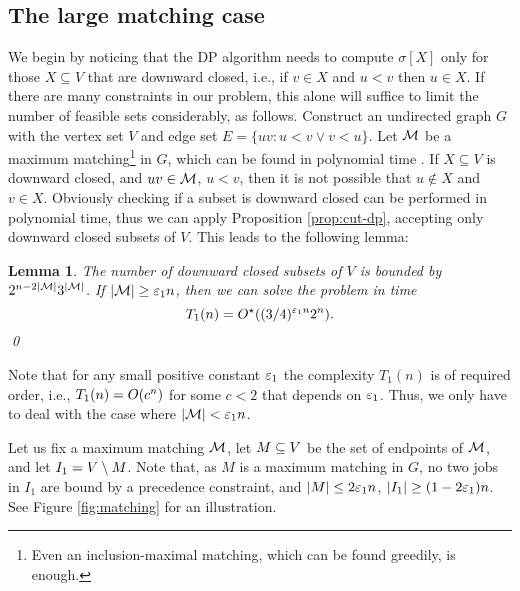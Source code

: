 \documentclass{article}
\newtheorem{lemma}[theorem]{Lemma}
\theoremstyle{definition}
\begin{document}
\subsection{The large matching case}

We begin by noticing that the DP algorithm needs to compute $\sigma[X]$ only for those
$X \subseteq V$ that are downward closed, i.e., if $v \in X$ and $u < v$ then $u \in X$.
If there are many constraints in our problem, this alone will suffice to limit the number
of feasible sets considerably, as follows.
Construct an undirected graph $G$ with the vertex set $V$ and edge set $E = \{uv: u < v \vee v < u\}$.
Let $\mathcal{M}$ be a maximum matching\footnote{Even an inclusion-maximal matching, which can be found greedily, is enough.}
in $G$, which can be found in polynomial time \cite{mucha-sankowski:matching}.
If $X \subseteq V$ is downward closed, and $uv \in \mathcal{M}$, $u < v$, then it is not possible that $u \notin X$ and $v \in X$.
Obviously checking if a subset is downward closed can be performed in polynomial time, thus we can apply Proposition \ref{prop:cut-dp},
accepting only downward closed subsets of $V$.
This leads to the following lemma:
\begin{lemma}\label{lem:matching}
The number of downward closed subsets of $V$ is bounded by $2^{n-2|\mathcal{M}|} 3^{|\mathcal{M}|}$.
If $|\mathcal{M}| \geq \varepsilon_1 n$, then we can solve the \schedname problem in time
$$T_1(n) = O^\star((3\slash 4)^{\varepsilon_1 n} 2^n).$$\qed
\end{lemma}
Note that for any small positive constant $\varepsilon_1$ the complexity $T_1(n)$ is of required order, i.e., 
$T_1(n) = O(c^n)$ for some $c<2$ that depends on $\varepsilon_1$.
Thus, we only have to deal with the case where $|\mathcal{M}| < \varepsilon_1 n$.

Let us fix a maximum matching $\mathcal{M}$, let $M \subseteq V$ be the set of endpoints of $\mathcal{M}$,
and let $I_1 = V \setminus M$.
Note that, as $M$ is a maximum matching in $G$, no two jobs in $I_1$ are bound by a precedence constraint,
and $|M| \leq 2\varepsilon_1 n$, $|I_1| \geq (1-2\varepsilon_1)n$.
See Figure \ref{fig:matching} for an illustration.
\end{document}
